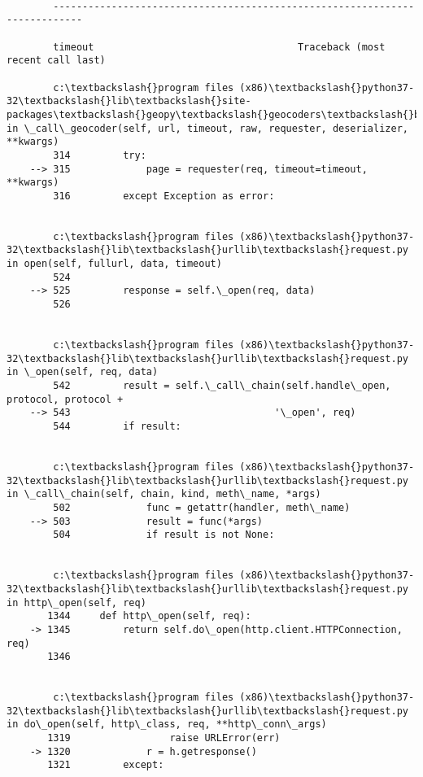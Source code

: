 \documentclass[11pt]{article}
\begin{document}
    \begin{Verbatim}[commandchars=\\\{\}]

        ---------------------------------------------------------------------------

        timeout                                   Traceback (most recent call last)

        c:\textbackslash{}program files (x86)\textbackslash{}python37-32\textbackslash{}lib\textbackslash{}site-packages\textbackslash{}geopy\textbackslash{}geocoders\textbackslash{}base.py in \_call\_geocoder(self, url, timeout, raw, requester, deserializer, **kwargs)
        314         try:
    --> 315             page = requester(req, timeout=timeout, **kwargs)
        316         except Exception as error:
    

        c:\textbackslash{}program files (x86)\textbackslash{}python37-32\textbackslash{}lib\textbackslash{}urllib\textbackslash{}request.py in open(self, fullurl, data, timeout)
        524 
    --> 525         response = self.\_open(req, data)
        526 
    

        c:\textbackslash{}program files (x86)\textbackslash{}python37-32\textbackslash{}lib\textbackslash{}urllib\textbackslash{}request.py in \_open(self, req, data)
        542         result = self.\_call\_chain(self.handle\_open, protocol, protocol +
    --> 543                                   '\_open', req)
        544         if result:
    

        c:\textbackslash{}program files (x86)\textbackslash{}python37-32\textbackslash{}lib\textbackslash{}urllib\textbackslash{}request.py in \_call\_chain(self, chain, kind, meth\_name, *args)
        502             func = getattr(handler, meth\_name)
    --> 503             result = func(*args)
        504             if result is not None:
    

        c:\textbackslash{}program files (x86)\textbackslash{}python37-32\textbackslash{}lib\textbackslash{}urllib\textbackslash{}request.py in http\_open(self, req)
       1344     def http\_open(self, req):
    -> 1345         return self.do\_open(http.client.HTTPConnection, req)
       1346 
    

        c:\textbackslash{}program files (x86)\textbackslash{}python37-32\textbackslash{}lib\textbackslash{}urllib\textbackslash{}request.py in do\_open(self, http\_class, req, **http\_conn\_args)
       1319                 raise URLError(err)
    -> 1320             r = h.getresponse()
       1321         except:
    


\end{Verbatim}
\end{document}
